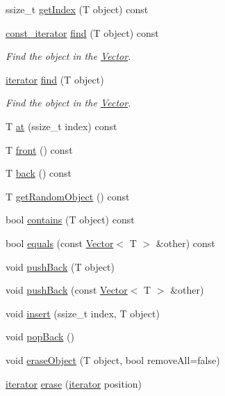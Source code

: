 \begin{DoxyCompactItemize}
ssize\+\_\+t \hyperlink{classVector_a21b8c98af0c86216bdee67ec581abc13}{get\+Index} (T object) const
\item 
\hyperlink{classVector_a484e934cc06bb84c7d70042e792b6e55}{const\+\_\+iterator} \hyperlink{classVector_a9ae8f35e4ea3ec88ebeda0b20bcf7d35}{find} (T object) const
\begin{DoxyCompactList}\small\item\em Find the object in the \hyperlink{classVector}{Vector}. \end{DoxyCompactList}\item 
\hyperlink{classVector_a45531016f99e90887e0f890f2da943e4}{iterator} \hyperlink{classVector_a0cc9f44b2dfb2431e36479badc0f22ff}{find} (T object)
\begin{DoxyCompactList}\small\item\em Find the object in the \hyperlink{classVector}{Vector}. \end{DoxyCompactList}\item 
T \hyperlink{classVector_a18868cf17d22de86d3f5a0569d774d2e}{at} (ssize\+\_\+t index) const
\item 
T \hyperlink{classVector_a237ab21eb5459aa729d157c27606725d}{front} () const
\item 
T \hyperlink{classVector_a50880f90b629b19db48d8fa13adbe7ec}{back} () const
\item 
T \hyperlink{classVector_a1d3180f23d1c9cfcbd5d8c9414f08ac8}{get\+Random\+Object} () const
\item 
bool \hyperlink{classVector_a20b0a89d6e0ee21d07315121867d84ef}{contains} (T object) const
\item 
bool \hyperlink{classVector_a3c4d1a9ee0630cf85060a79551e29144}{equals} (const \hyperlink{classVector}{Vector}$<$ T $>$ \&other) const
\item 
void \hyperlink{classVector_a3fa393713cf34ed2ad97538f866f09e7}{push\+Back} (T object)
\item 
void \hyperlink{classVector_abf8b935246cbe7710aabf8e1f3e63952}{push\+Back} (const \hyperlink{classVector}{Vector}$<$ T $>$ \&other)
\item 
void \hyperlink{classVector_af26422bc96ef24de9752fc17270084b3}{insert} (ssize\+\_\+t index, T object)
\item 
void \hyperlink{classVector_a91c45b15e4cff53bad3628b75382793f}{pop\+Back} ()
\item 
void \hyperlink{classVector_a068bbab154b844cea8a7013bf12f30b3}{erase\+Object} (T object, bool remove\+All=false)
\item 
\hyperlink{classVector_a45531016f99e90887e0f890f2da943e4}{iterator} \hyperlink{classVector_a65771dd1c5da427eabb9818ba9558113}{erase} (\hyperlink{classVector_a45531016f99e90887e0f890f2da943e4}{iterator} position)

\end{DoxyCompactItemize}

